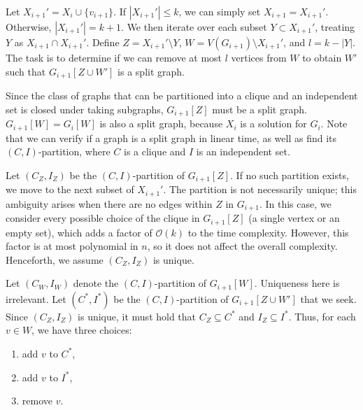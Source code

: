 \documentclass[12pt]{article}
\begin{document}
	\medskip
	
	Let \(X_{i + 1}' = X_{i} \cup \{v_{i + 1}\}\). If \(|X_{i + 1}'| \leqslant
	k\), we can simply set \(X_{i + 1} = X_{i + 1}'\). Otherwise, \(|X_{i + 1}'|
	= k + 1\). We then iterate over each subset \(Y \subset X_{i + 1}'\),
	treating \(Y\) as \(X_{i + 1} \cap X_{i + 1}'\). Define \(Z = X_{i + 1}'
	\setminus Y\), \(W = V(G_{i + 1}) \setminus X_{i + 1}'\), and \(l = k -
	|Y|\). The task is to determine if we can remove at most \(l\) vertices from
	\(W\) to obtain \(W'\) such that \(G_{i + 1}[Z \cup W']\) is a split graph.
	
	\medskip
	
	Since the class of graphs that can be partitioned into a clique and an
	independent set is closed under taking subgraphs, \(G_{i + 1}[Z]\) must be a
	split graph. \(G_{i + 1}[W] = G_{i}[W]\) is also a split graph, because
	\(X_{i}\) is a solution for \(G_{i}\). Note that we can verify if a graph is
	a split graph in linear time, as well as find its \((C, I)\)-partition,
	where \(C\) is a clique and \(I\) is an independent set.
	
	\medskip
	
	Let \((C_{Z}, I_{Z})\) be the \((C, I)\)-partition of \(G_{i + 1}[Z]\). If
	no such partition exists, we move to the next subset of \(X_{i + 1}'\). The
	partition is not necessarily unique; this ambiguity arises when there are no
	edges within \(Z\) in \(G_{i + 1}\). In this case, we consider every
	possible choice of the clique in \(G_{i + 1}[Z]\) (a single vertex or an
	empty set), which adds a factor of \(\mathcal{O}(k)\) to the time
	complexity. However, this factor is at most polynomial in \(n\), so it does
	not affect the overall complexity. Henceforth, we assume \((C_{Z}, I_{Z})\)
	is unique.
	
	\medskip
	
	Let \((C_{W}, I_{W})\) denote the \((C, I)\)-partition of \(G_{i + 1}[W]\).
	Uniqueness here is irrelevant. Let \((C^{\ast}, I^{\ast})\) be the
	\((C, I)\)-partition of \(G_{i + 1}[Z \cup W']\) that we seek. Since
	\((C_{Z}, I_{Z})\) is unique, it must hold that \(C_{Z} \subseteq C^{\ast}\)
	and \(I_{Z} \subseteq I^{\ast}\). Thus, for each \(v \in W\), we have three
	choices:
	\begin{enumerate}
		\item add \(v\) to \(C^{\ast}\),
		\item add \(v\) to \(I^{\ast}\),
		\item remove \(v\).
	\end{enumerate}
	
\end{document}

